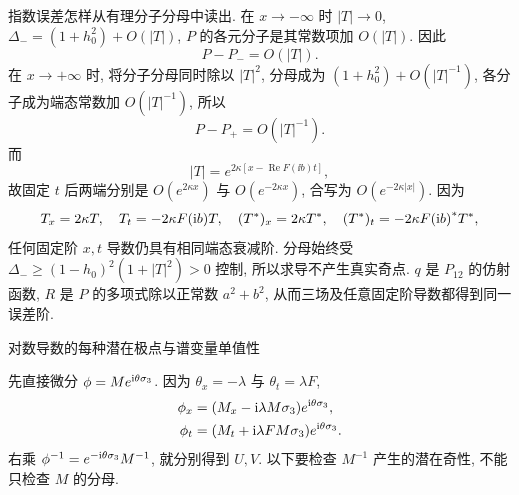 \par\smallskip\noindent 指数误差怎样从有理分子分母中读出.\quad
在 $x\to-\infty$ 时 $|T|\to0$,
$\Delta_-=(1+h_0^2)+O(|T|)$,
$P$ 的各元分子是其常数项加 $O(|T|)$.
因此
\begin{equation*}
P-P_-=O(|T|).
\end{equation*}
在 $x\to+\infty$ 时, 将分子分母同时除以 $|T|^2$,
分母成为 $(1+h_0^2)+O(|T|^{-1})$,
各分子成为端态常数加 $O(|T|^{-1})$, 所以
\begin{equation*}
P-P_+=O(|T|^{-1}).
\end{equation*}
而
\begin{equation*}
|T|=e^{2\kappa[x-\operatorname{Re}F(\ii b)t]},
\end{equation*}
故固定 $t$ 后两端分别是 $O(e^{2\kappa x})$ 与
$O(e^{-2\kappa x})$, 合写为 $O(e^{-2\kappa|x|})$.
因为
\begin{equation*}
T_x=2\kappa T,\quad
T_t=-2\kappa F(\mathrm{i} b)T,\quad
({T}^{*})_x=2\kappa{T}^{*},\quad
({T}^{*})_t=-2\kappa{F(\mathrm{i}b)}^{*}{T}^{*},
\end{equation*}
任何固定阶 $x,t$ 导数仍具有相同端态衰减阶.
分母始终受 $\Delta_-\ge(1-h_0)^2(1+|T|^2)>0$ 控制,
所以求导不产生真实奇点.
$q$ 是 $P_{12}$ 的仿射函数,
$R$ 是 $P$ 的多项式除以正常数 $a^2+b^2$,
从而三场及任意固定阶导数都得到同一误差阶.
\par\medskip\noindent 对数导数的每种潜在极点与谱变量单值性\par
先直接微分 $\phi=Me^{\mathrm{i}\theta\sigma_3}$.
因为 $\theta_x=-\lambda$ 与 $\theta_t=\lambda F$,
\begin{equation*}
\begin{aligned}
\phi_x
&=(M_x-\mathrm{i}\lambda M\sigma_3)e^{\mathrm{i}\theta\sigma_3},\\
\phi_t
&=(M_t+\mathrm{i}\lambda F M\sigma_3)e^{\mathrm{i}\theta\sigma_3}.
\end{aligned}
\end{equation*}
右乘 $\phi^{-1}=e^{-\mathrm{i}\theta\sigma_3}M^{-1}$,
就分别得到 $ U, V$.
以下要检查 $M^{-1}$ 产生的潜在奇性, 不能只检查 $M$ 的分母.

